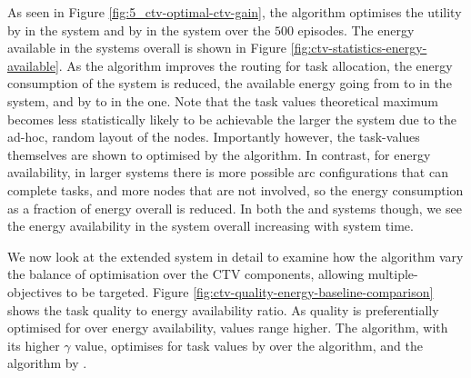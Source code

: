 As seen in Figure \ref{fig:5_ctv-optimal-ctv-gain}, the \algorithmBalanced{}{} algorithm optimises the utility by \resultsCTVBalancedDiff{}{}  in the \simulationSimple{}{} system and by \resultsCTVBalancedExtDiff{}{} in the \simulationExtended{}{} system over the $500$ episodes. The energy available in the systems overall is shown in Figure \ref{fig:ctv-statistics-energy-available}. As the algorithm improves the routing for task allocation, the energy consumption of the system is reduced, the available energy going from \resultsEnergyBalancedStart{}{} to \resultsEnergyBalancedEnd{}{} in the \simulationSimple{}{} system, and by \resultsEnergyBalancedExtStart{}{} to \resultsEnergyBalancedExtEnd{}{} in the \simulationExtended{}{} one. Note that the task values theoretical maximum becomes less statistically likely to be achievable the larger the system due to the ad-hoc, random layout of the nodes. Importantly however, the task-values themselves are shown to optimised by the algorithm. In contrast, for energy availability, in larger systems there is more possible arc configurations that can complete tasks, and more nodes that are not involved, so the  energy consumption as a fraction of energy overall is reduced. In both the \simulationSimple{}{} and \simulationExtended{}{} systems though, we see the energy availability in the system overall increasing with system time.

We now look at the extended system in detail to examine how the algorithm vary the balance  of optimisation over the CTV components, allowing multiple-objectives to be targeted. Figure 	\ref{fig:ctv-quality-energy-baseline-comparison} shows the task quality to energy availability ratio. 
As quality is preferentially optimised for over energy availability, values range higher. The \algorithmQuality{}{} algorithm, with its higher $\gamma$ value, optimises for task values by \resultsQEQualityEnd{}{} over the \algorithmEnergy{}{} algorithm, and the \algorithmDistribution{}{} algorithm by \resultsQEDistDiff{}{}. 

